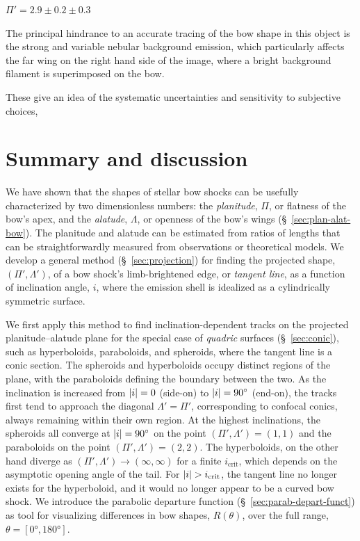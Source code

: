 \(\Pi' = 2.9 \pm 0.2 \pm 0.3\)

The principal hindrance to an accurate tracing of the bow shape in
this object is the strong and variable nebular background emission,
which particularly affects the far wing on the right hand side of the
image, where a bright background filament is superimposed on the bow.

These give an idea of the systematic uncertainties and sensitivity to
subjective choices,

\section{Summary and discussion}
\label{sec:conc}

We have shown that the shapes of stellar bow shocks can be usefully
characterized by two dimensionless numbers: the \textit{planitude},
\(\Pi\), or flatness of the bow's apex, and the \textit{alatude},
\(\Lambda\), or openness of the bow's wings (\S~\ref{sec:plan-alat-bow}).
The planitude and alatude can be estimated from ratios of lengths that
can be straightforwardly measured from observations or theoretical
models.  We develop a general method (\S~\ref{sec:projection}) for
finding the projected shape, \((\Pi', \Lambda')\), of a bow shock's
limb-brightened edge, or \textit{tangent line}, as a function of
inclination angle, \(i\), where the emission shell is idealized as a
cylindrically symmetric surface.

We first apply this method to find inclination-dependent tracks on the
projected planitude--alatude plane for the special case of
\textit{quadric} surfaces (\S~\ref{sec:conic}), such as hyperboloids,
paraboloids, and spheroids, where the tangent line is a conic section.
The spheroids and hyperboloids occupy distinct regions of the plane,
with the paraboloids defining the boundary between the two.  As the
inclination is increased from \(\lvert i\rvert = 0\) (side-on) to
\(\lvert i\rvert = \ang{90}\) (end-on), the tracks first tend to approach the
diagonal \(\Lambda' = \Pi'\), corresponding to confocal conics, always
remaining within their own region.  At the highest inclinations, the
spheroids all converge at \(\lvert i\rvert = \ang{90}\) on the point
\((\Pi', \Lambda') = (1, 1)\) and the paraboloids on the point
\((\Pi', \Lambda') = (2, 2)\).  The hyperboloids, on the other hand diverge as
\((\Pi', \Lambda') \to (\infty, \infty)\) for a finite
\(i_{\mathrm{crit}}\), which depends on the asymptotic opening angle
of the tail.  For \(\lvert i\rvert > i_{\mathrm{crit}}\), the tangent line no
longer exists for the hyperboloid, and it would no longer appear to be
a curved bow shock.  We introduce the parabolic departure function
(\S~\ref{sec:parab-depart-funct}) as tool for visualizing differences
in bow shapes, \(R(\theta)\), over the full range,
\(\theta = [\ang{0}, \ang{180}]\).

